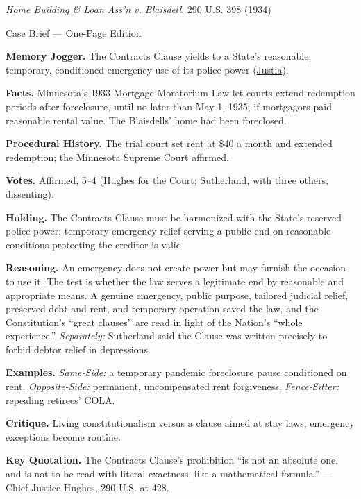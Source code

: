 \documentclass[12pt]{article}
\begin{document}
\begin{center}
{\Large \textit{Home Building \& Loan Ass'n v. Blaisdell}, 290 U.S. 398 (1934)\par}
\vspace{0.3em}
{\normalsize Case Brief --- One-Page Edition\par}
\end{center}

\textbf{Memory Jogger.} The Contracts Clause yields to a State's reasonable, temporary, conditioned emergency use of its police power (\href{https://supreme.justia.com/cases/federal/us/290/398/}{Justia}).

\textbf{Facts.} Minnesota's 1933 Mortgage Moratorium Law let courts extend redemption periods after foreclosure, until no later than May 1, 1935, if mortgagors paid reasonable rental value. The Blaisdells' home had been foreclosed.

\textbf{Procedural History.} The trial court set rent at \$40 a month and extended redemption; the Minnesota Supreme Court affirmed.

\textbf{Votes.} Affirmed, 5--4 (Hughes for the Court; Sutherland, with three others, dissenting).

\textbf{Holding.} The Contracts Clause must be harmonized with the State's reserved police power; temporary emergency relief serving a public end on reasonable conditions protecting the creditor is valid.

\textbf{Reasoning.} An emergency does not create power but may furnish the occasion to use it. The test is whether the law serves a legitimate end by reasonable and appropriate means. A genuine emergency, public purpose, tailored judicial relief, preserved debt and rent, and temporary operation saved the law, and the Constitution's ``great clauses'' are read in light of the Nation's ``whole experience.'' \emph{Separately:} Sutherland said the Clause was written precisely to forbid debtor relief in depressions.

\textbf{Examples.} \emph{Same-Side:} a temporary pandemic foreclosure pause conditioned on rent. \emph{Opposite-Side:} permanent, uncompensated rent forgiveness. \emph{Fence-Sitter:} repealing retirees' COLA.

\textbf{Critique.} Living constitutionalism versus a clause aimed at stay laws; emergency exceptions become routine.

\textbf{Key Quotation.} The Contracts Clause's prohibition ``is not an absolute one, and is not to be read with literal exactness, like a mathematical formula.'' --- Chief Justice Hughes, 290 U.S. at 428.
\end{document}
